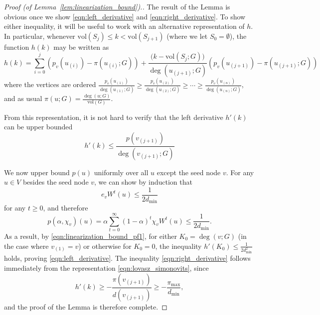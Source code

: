 \documentclass[11pt,twoside]{article}
\newcommand{\vol}{\mathrm{vol}}
\newcommand{\1}{\mathbf{1}}
\begin{document}
\begin{proof}[Proof (of Lemma~\ref{lem:linearization_bound}).]
	The result of the Lemma is obvious once we show \eqref{eqn:left_derivative} and \eqref{eqn:right_derivative}. To show either inequality, it will be useful to work with an alternative representation of $h$. In particular,  whenever $\vol(S_j) \leq k < \vol(S_{j + 1})$ (where we let $S_0 = \emptyset$), the function $h(k)$ may be written as
	\begin{equation}
	\label{eqn:lovasz_simonovits}
	h(k) = \sum_{i = 0}^{j} \left(p_v(u_{(i)}) - \pi(u_{(i)};G)\right) + \frac{\bigl(k - \vol(S_j;G)\bigr)}{\deg(u_{(j + 1)};G)} \left(p_v(u_{(j+1)}) - \pi(u_{(j+1)};G)\right) 
	\end{equation}
	where the vertices are ordered $\frac{p_v(u_{(1)})}{\deg(u_{(1)};G)} \geq \frac{p_v(u_{(2)})}{\deg(u_{(2)};G)} \geq \cdots \geq \frac{p_v(u_{(n)})}{\deg(u_{(n)};G)}$, and as usual $\pi(u;G) = \frac{\deg(u;G)}{\vol(G)}$. 
	
	From this representation, it is not hard to verify that the left derivative $h'(k)$ can be upper bounded
	\begin{equation}
	\label{eqn:linearization_bound_pf1}
	h'(k) \leq \frac{p(v_{(j + 1)})}{\deg(v_{(j + 1)};G)}
	\end{equation}
	
	We now upper bound $p(u)$ uniformly over all $u$ except the seed node $v$. For any $u \in V$ besides the seed node $v$, we can show by induction that
	\begin{equation*}
	e_v W^t(u) \leq \frac{1}{2 d_{\min}}
	\end{equation*} 
	for any $t \geq 0$, and therefore
	\begin{equation}
	\label{eqn:linearization_bound_pf2}
	p(\alpha,\chi_v)(u) = \alpha \sum_{t = 0}^{\infty} (1 - \alpha)^t \chi_v W^t(u) \leq  \frac{1}{2d_{\min}}.
	\end{equation}
	As a result, by \eqref{eqn:linearization_bound_pf1}, for either $K_0 = \deg(v;G)$ (in the case where $v_{(1)} = v$) or otherwise for $K_0 = 0$, the inequality $h'(K_0) \leq \frac{1}{2d_{\min}^2}$ holds, proving \eqref{eqn:left_derivative}. The inequality \eqref{eqn:right_derivative} follows immediately from the representation \eqref{eqn:lovasz_simonovits}, since
	\begin{equation*}
	h'(k) \geq -\frac{\pi(v_{(j+1)})}{d(v_{(j + 1)})} \geq -\frac{\pi_{\max}}{d_{\min}},
	\end{equation*}
	and the proof of the Lemma is therefore complete.
\end{proof}
\end{document}
